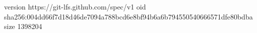 version https://git-lfs.github.com/spec/v1
oid sha256:004dd66f7d18d46de7094a788bcd6e8bf94b6a6b794550540666571dfe80bdba
size 1398204
